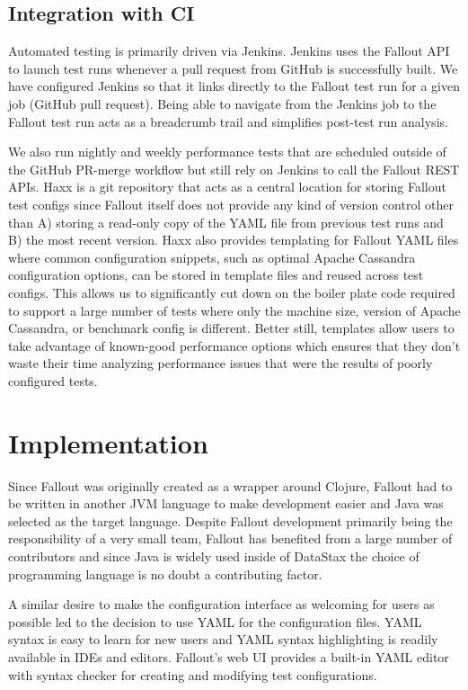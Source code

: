 \documentclass[a4paper,fleqn]{cas-dc}
\begin{document}
\subsection{Integration with CI}

Automated testing is primarily driven via Jenkins. Jenkins uses the Fallout API to launch test runs
whenever a pull request from GitHub is successfully built. We have configured Jenkins so that it
links directly to the Fallout test run for a given job (GitHub pull request). Being able to navigate
from the Jenkins job to the Fallout test run acts as a breadcrumb trail and simplifies post-test run
analysis.

We also run nightly and weekly performance tests that are scheduled outside of the GitHub PR-merge
workflow but still rely on Jenkins to call the Fallout REST APIs. Haxx is a git repository that acts
as a central location for storing Fallout test configs since Fallout itself does not provide any
kind of version control other than A) storing a read-only copy of the YAML file from previous test
runs and B) the most recent version. Haxx also provides templating for Fallout YAML files where
common configuration snippets, such as optimal Apache Cassandra configuration options, can be stored
in template files and reused across test configs. This allows us to significantly cut down on the
boiler plate code required to support a large number of tests where only the machine size, version
of Apache Cassandra, or benchmark config is different. Better still, templates allow users to take
advantage of known-good performance options which ensures that they don’t waste their time analyzing
performance issues that were the results of poorly configured tests.

\section{Implementation}\label{implementation}

Since Fallout was originally created as a wrapper around Clojure, Fallout had to be written in
another JVM language to make development easier and Java was selected as the target language.
Despite Fallout development primarily being the responsibility of a very small team, Fallout has
benefited from a large number of contributors and since Java is widely used inside of DataStax the
choice of programming language is no doubt a contributing factor.

A similar desire to make the configuration interface as welcoming for users as possible led to the
decision to use YAML for the configuration files. YAML syntax is easy to learn for new users and
YAML syntax highlighting is readily available in IDEs and editors. Fallout’s web UI provides a
built-in YAML editor with syntax checker for creating and modifying test configurations.
\end{document}
